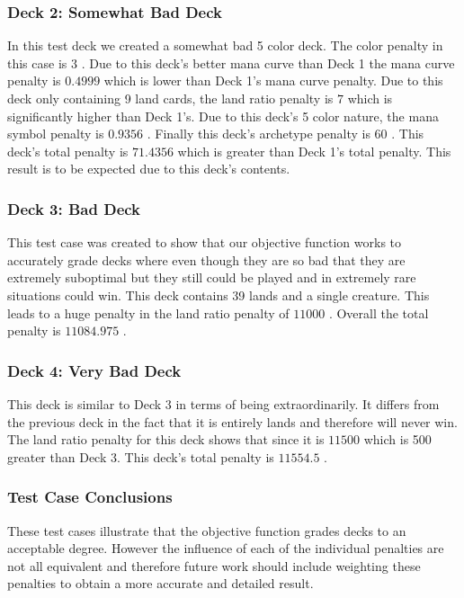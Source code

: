 \documentclass[12pt, letterpaper]{article}
\begin{document}
\subsubsection{Deck 2: Somewhat Bad Deck}

In this test deck we created a somewhat bad 5 color deck. The color penalty in this case is $ 3 $ .
Due to this deck's better mana curve than Deck 1 the mana curve penalty is $ 0.4999 $ which is lower than
Deck 1's mana curve penalty. Due to this deck only containing 9 land cards, the land ratio penalty is $ 7 $
which is significantly higher than Deck 1's. Due to this deck's 5 color nature, the mana symbol penalty
is $ 0.9356 $ . Finally this deck's archetype penalty is $ 60 $ . This deck's total penalty is $ 71.4356 $ which is
greater than Deck 1's total penalty. This result is to be expected due to this deck's contents.

\subsubsection{Deck 3: Bad Deck}

This test case was created to show that our objective function works to accurately grade decks
where even though they are so bad that they are extremely suboptimal but they still could be played
and in extremely rare situations could win. This deck contains 39 lands and a single creature. This leads to a
huge penalty in the land ratio penalty of $ 11000 $ . Overall the total penalty is $ 11084.975 $ .

\subsubsection{Deck 4: Very Bad Deck}

This deck is similar to Deck 3 in terms of being extraordinarily. It differs from the previous
deck in the fact that it is entirely lands and therefore will never win. The land ratio penalty for this
deck shows that since it is $ 11500 $ which is 500 greater than Deck 3. This deck's total penalty is $ 11554.5 $ .

\subsubsection{Test Case Conclusions}

These test cases illustrate that the objective function grades decks to an acceptable degree. However the influence
of each of the individual penalties are not all equivalent and therefore future work should include weighting
these penalties to obtain a more accurate and detailed result.
\end{document}
